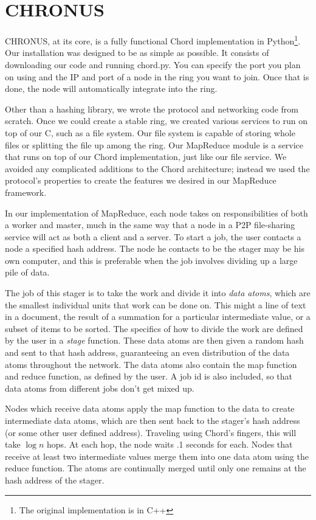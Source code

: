 \documentclass[conference, compsocconf, letterpaper]{IEEEtran}
\begin{document}
\section{CHRONUS}


CHRONUS, at its core, is a fully functional Chord implementation in Python\footnote{The original implementation is in C++}.  Our installation was designed to be as simple as possible.   It consists of downloading our code\cite{code} and running chord.py.  You can specify the port you plan on using and the IP and port of a node in the ring you want to join.  Once that is done, the node will automatically integrate into the ring.

Other than a hashing library, we wrote the protocol and networking code from scratch.  Once we could create a stable ring, we created various services to run on top of our C, such as a file system.  Our file system is capable of storing whole files or splitting the file up among the ring. Our MapReduce module is a service that runs on top of our Chord implementation, just like our file service.    We avoided any complicated additions to the Chord architecture; instead we used the protocol's properties to create the features we desired in our MapReduce framework. 
  
In our implementation of MapReduce, each node takes on responsibilities of both a worker and master, much in the same way that a node in a P2P file-sharing service will act as both a client and a server.  To start a job, the user contacts a node a specified hash address. The node he contacts to be the stager may be his own computer, and this is preferable when the job involves dividing up a large pile of data. 

The job of this stager is to take the work and divide it into \emph{data atoms}, which are the smallest individual units that work can be done on.  This might a line of text in a document, the result of a summation for a particular intermediate value, or a subset of items to be sorted.  The specifics of how to divide the work are defined by the user in a \emph{stage} function.  These data atoms are then given a random hash and sent to that hash address, guaranteeing an even distribution of the data atoms throughout the network.  The data atoms also contain the map function and reduce function, as defined by the user.  A job id is also included, so that data atoms from different jobs don't get mixed up.

Nodes which receive data atoms apply the map function to the data to create intermediate data atoms, which are then sent back to the stager's hash address (or some other user defined address).  Traveling using Chord's fingers, this will take $\log n$ hops.  At each hop, the node waits .1 seconds for each. Nodes that receive at least two intermediate values merge them into one data atom using the reduce function.   The atoms are continually merged until only one remains at the hash address of the stager. 
\end{document}
